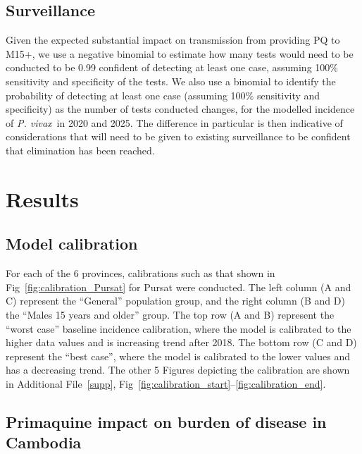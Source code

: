 \documentclass[doublespacing]{bmcart}
\newcommand{\pv}{\textit{P. vivax}}
\begin{document}
\subsection*{Surveillance}
Given the expected substantial impact on transmission from providing PQ to M15+, we use a negative binomial to estimate how many tests would need to be conducted to be 0.99 confident of detecting at least one case, assuming 100\% sensitivity and specificity of the tests. We also use a binomial to identify the probability of detecting at least one case (assuming 100\% sensitivity and specificity) as the number of tests conducted changes, for the modelled incidence of \pv~in 2020 and 2025. The difference in particular is then indicative of considerations that will need to be given to existing surveillance to be confident that elimination has been reached.


\section*{Results}

\subsection*{Model calibration}
For each of the 6 provinces, calibrations such as that shown in Fig~\ref{fig:calibration_Pursat} for Pursat were conducted. The left column (A and C) represent the ``General'' population group, and the right column (B and D) the ``Males 15 years and older'' group. The top row (A and B) represent the ``worst case'' baseline incidence calibration, where the model is calibrated to the higher data values and is increasing trend after 2018. The bottom row (C and D) represent the ``best case'', where the model is calibrated to the lower values and has a decreasing trend. The other 5 Figures depicting the calibration are shown in Additional File~\ref{supp}, Fig~\ref{fig:calibration_start}--\ref{fig:calibration_end}.

\subsection*{Primaquine impact on burden of disease in Cambodia} \label{sec:impact}
\end{document}
